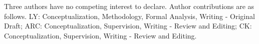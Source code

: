 Three authors have no competing interest to declare. Author contributions are as follows. LY: Conceptualization, Methodology, Formal Analysis, Writing - Original Draft; ARC: Conceptualization, Supervision, Writing - Review and Editing; CK: Conceptualization, Supervision, Writing - Review and Editing.